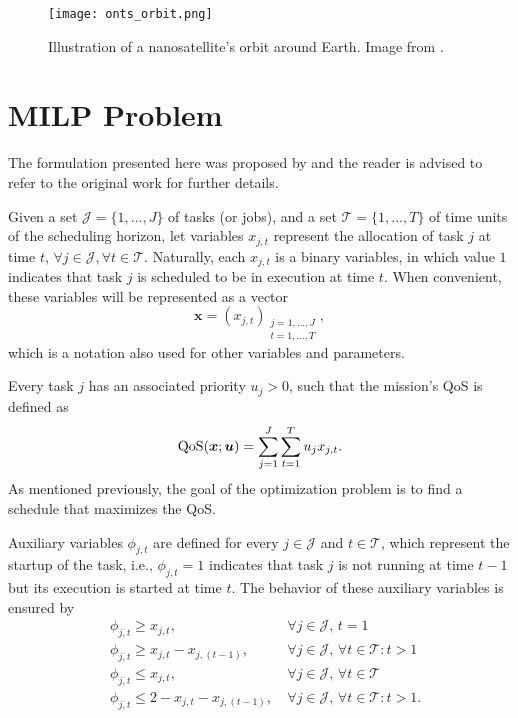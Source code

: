 \begin{figure}[h]
    \centering
    \texttt{[image: onts\_orbit.png]}
    \caption{Illustration of a nanosatellite's orbit around Earth. Image from .}
    \label{fig:onts-orbit}
\end{figure}


\section{MILP Problem}

The formulation presented here was proposed by  and the reader is advised to refer to the original work for further details.

Given a set $\mathcal{J}=\{1,...,J\}$ of tasks (or jobs), and a set $\mathcal{T}=\{1,...,T\}$ of time units of the scheduling horizon, let variables $x_{j,t}$ represent the allocation of task $j$ at time $t$, $\forall j\in \mathcal{J}, \forall t\in \mathcal{T}$.
Naturally, each $x_{j,t}$ is a binary variables, in which value $1$ indicates that task $j$ is scheduled to be in execution at time $t$.
When convenient, these variables will be represented as a vector \[
    \bm{x} = \left( x_{j,t} \right)_{\substack{j=1,\ldots,J\\ t=1,\ldots,T}}
,\] which is a notation also used for other variables and parameters.

Every task $j$ has an associated priority $u_j > 0$, such that the mission's QoS is defined as
\begin{equation}\label{eq:qos}
    {\rm QoS}(\bm{x};\bm{u}) = \sum_{j=1}^{J} \sum_{t=1}^{T} {u}_{j} x_{j,t}
.\end{equation}
As mentioned previously, the goal of the optimization problem is to find a schedule that maximizes the QoS.

Auxiliary variables $\phi_{j,t}$ are defined for every $j\in \mathcal{J}$ and $t\in \mathcal{T}$, which represent the startup of the task, i.e., $\phi_{j,t} = 1$ indicates that task $j$ is not running at time $t-1$ but its execution is started at time $t$.
The behavior of these auxiliary variables is ensured by
\begin{equation}\label{eq:phi-constraints}
    \begin{aligned}
	& \phi_{j,t} \geq x_{j,t}, &~\forall j\in\mathcal{J},\, t = 1  \\
        & \phi_{j,t} \geq x_{j,t} - x_{j,(t-1)}, &~\forall j\in\mathcal{J}, \,\forall t\in\mathcal{T}: t > 1   \\
        & \phi_{j,t} \leq x_{j,t}, &~\forall j\in\mathcal{J}, \,\forall t\in\mathcal{T}   \\
        & \phi_{j,t} \leq 2 - x_{j,t} - x_{j,(t-1)}, &~\forall j\in\mathcal{J}, \,\forall t\in\mathcal{T}: t > 1
    .\end{aligned}
\end{equation}

